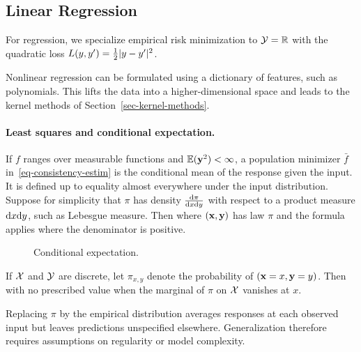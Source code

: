 \subsection{Linear Regression}
\label{sec-linear-models}

For regression, we specialize empirical risk minimization to $\mathcal{Y}=\mathbb{R}$ with the quadratic loss $L(y,y')=\frac{1}{2}|y-y'|^2$.

Nonlinear regression can be formulated using a dictionary of features, such as polynomials. This lifts the data into a higher-dimensional space and leads to the kernel methods of Section~\ref{sec-kernel-methods}.

\paragraph{Least squares and conditional expectation.}

If $f$ ranges over measurable functions and $\mathbb{E}(\mathbf{y}^2)<\infty$, a population minimizer $\bar f$ in~\eqref{eq-consistency-estim} is the conditional mean of the response given the input. It is defined up to equality almost everywhere under the input distribution.
%
Suppose for simplicity that $\pi$ has density $\frac{\mathrm{d} \pi}{\mathrm{d} x \mathrm{d} y}$ with respect to a product measure $\mathrm{d} x \mathrm{d} y$, such as Lebesgue measure. Then
where $(\mathbf{x},\mathbf{y})$ has law $\pi$ and the formula applies where the denominator is positive.


\begin{figure}[tbp]
\centering
{}
\caption{Conditional expectation.}
\label{fig-bound-regul}
\end{figure}

If $\mathcal{X}$ and $\mathcal{Y}$ are discrete, let $\pi_{x,y}$ denote the probability of $(\mathbf{x}=x,\mathbf{y}=y)$. Then
with no prescribed value when the marginal of $\pi$ on $\mathcal{X}$ vanishes at $x$.

Replacing $\pi$ by the empirical distribution averages responses at each observed input but leaves predictions unspecified elsewhere. Generalization therefore requires assumptions on regularity or model complexity.


